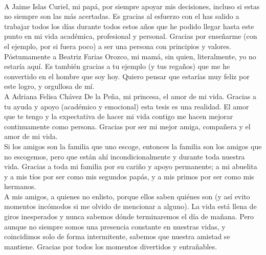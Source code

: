 \documentclass[
12pt, %
spanish, %
onehalfspacing, %
headsepline, %
]{MastersDoctoralThesis} %
\begin{document}

\begin{acknowledgements}
\addchaptertocentry{\acknowledgementname} %
\\
A Jaime Islas Curiel, mi papá, por siempre apoyar mis decisiones, incluso si estas no siempre son las más acertadas. Es gracias al esfuerzo con el has salido a trabajar todos los días durante todos estos años que he podido llegar hasta este punto en mi vida académica, profesional y personal. Gracias por enseñarme (con el ejemplo, por si fuera poco) a ser una persona con principios y valores.\\

Póstumamente a Beatriz Farias Orozco, mi mamá, sin quien, literalmente, yo no estaría aquí. Es también gracias a tu ejemplo (y tus regaños) que me he convertido en el hombre que soy hoy. Quiero pensar que estarías muy feliz por este logro, y orgullosa de mí.\\

A Adriana Felisa Chávez De la Peña, mi princesa, el amor de mi vida. Gracias a tu ayuda y apoyo (académico y emocional) esta tesis es una realidad. El amor que te tengo y la expectativa de hacer mi vida contigo me hacen mejorar continuamente como persona. Gracias por ser mi mejor amiga, compañera y el amor de mi vida.\\

Si los amigos son la familia que uno escoge, entonces la familia son los amigos que no escogemos, pero que están ahí incondicionalmente y durante toda nuestra vida. Gracias a toda mi familia por su cariño y apoyo permanente; a mi abuelita y a mis tíos por ser como mis segundos papás, y a mis primos por ser como mis hermanos.\\

A mis amigos, a quienes no enlisto, porque ellos saben quiénes son (y así evito momentos incómodos si me olvido de mencionar a alguno). La vida está llena de giros inesperados y nunca sabemos dónde terminaremos el día de mañana. Pero aunque no siempre somos una presencia constante en nuestras vidas, y coincidimos solo de forma intermitente, sabemos que nuestra amistad se mantiene. Gracias por todos los momentos divertidos y entrañables.\\

\clearpage


\end{acknowledgements}
\end{document}
